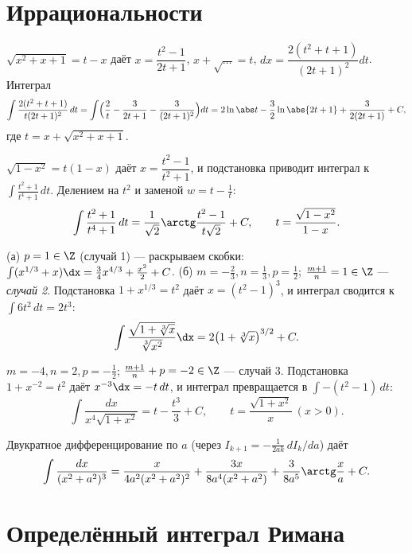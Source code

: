 \section{Иррациональности}

\sol $\sqrt{x^2+x+1}=t-x$ даёт $x=\dfrac{t^2-1}{2t+1}$, $x+\sqrt{\dots}=t$,
$dx=\dfrac{2(t^2+t+1)}{(2t+1)^2}dt$. Интеграл
\[
  \int\frac{2(t^2+t+1)}{t(2t+1)^2}\,dt=\int\Bigl(\frac2t-\frac3{2t+1}-\frac3{(2t+1)^2}\Bigr)dt
  =2\ln\abs t-\frac32\ln\abs{2t+1}+\frac{3}{2(2t+1)}+C,
\]
где $t=x+\sqrt{x^2+x+1}$.

\sol $\sqrt{1-x^2}=t(1-x)$ даёт $x=\dfrac{t^2-1}{t^2+1}$, и подстановка приводит интеграл к
$\displaystyle\int\frac{t^2+1}{t^4+1}\,dt$. Делением на $t^2$ и заменой $w=t-\tfrac1t$:
\[
  \int\frac{t^2+1}{t^4+1}\,dt=\frac1{\sqrt2}\arctg\frac{t^2-1}{t\sqrt2}+C,\qquad
  t=\frac{\sqrt{1-x^2}}{1-x}.
\]

\sol (а) $p=1\in\Z$ (случай 1) — раскрываем скобки:
$\int(x^{1/3}+x)\dx=\tfrac34 x^{4/3}+\tfrac{x^2}{2}+C$.\;
(б) $m=-\tfrac23,n=\tfrac13,p=\tfrac12$; $\tfrac{m+1}{n}=1\in\Z$ — \emph{случай 2}. Подстановка
$1+x^{1/3}=t^2$ даёт $x=(t^2-1)^3$, и интеграл сводится к $\int6t^2\,dt=2t^3$:
\[
  \int\frac{\sqrt{1+\sqrt[3]{x}}}{\sqrt[3]{x^2}}\dx=2\bigl(1+\sqrt[3]{x}\bigr)^{3/2}+C.
\]

\sol $m=-4,n=2,p=-\tfrac12$; $\tfrac{m+1}{n}+p=-2\in\Z$ — случай 3. Подстановка $1+x^{-2}=t^2$ даёт
$x^{-3}\dx=-t\,dt$, и интеграл превращается в $\int-(t^2-1)\,dt$:
\[
  \int\frac{dx}{x^4\sqrt{1+x^2}}=t-\frac{t^3}{3}+C,\qquad t=\frac{\sqrt{1+x^2}}{x}\ (x>0).
\]

\sol Двукратное дифференцирование по $a$ (через $I_{k+1}=-\tfrac1{2ak}\,dI_k/da$) даёт
\[
  \int\frac{dx}{(x^2+a^2)^3}=\frac{x}{4a^2(x^2+a^2)^2}+\frac{3x}{8a^4(x^2+a^2)}
   +\frac{3}{8a^5}\arctg\frac xa+C.
\]

\section{Определённый интеграл Римана}

